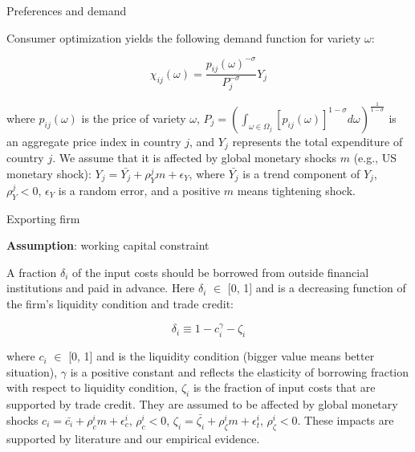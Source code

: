 \documentclass[10pt]{beamer}
\begin{document}
\begin{frame}{Preferences and demand}

Consumer optimization yields the following demand function for variety $\omega$:

\begin{equation}
\chi_{ij}(\omega)=\frac{p_{ij}(\omega)^{-\sigma}}{P_j^{-\sigma}} Y_j
\end{equation}


where $p_{ij}(\omega)$ is the price of variety $\omega$, $P_j=(\int_{\omega \in \Omega_j} [p_{ij}(\omega)]^{1-\sigma} d \omega)^{\frac{1}{1-\sigma}}$ is an aggregate price index in country $j$, and $Y_j$ represents the total expenditure of country $j$. We assume that it is affected by global monetary shocks $m$ (e.g., US monetary shock): $Y_j=\bar{Y_j}+\rho_{Y}^j m+\epsilon_Y$, where $\bar{Y_j}$ is a trend component of $Y_j$, $\rho_{Y}^j<0$, $\epsilon_Y$ is a random error, and a positive $m$ means tightening shock.

\end{frame}



\begin{frame}{Exporting firm}

\textbf{Assumption}: working capital constraint
\vfill

A fraction $\delta_i$ of the input costs should be borrowed from outside financial institutions and paid in advance. Here $\delta_i$ $\in$ [0, 1] and is a decreasing function of the firm's liquidity condition and trade credit: 

$$
\delta_i \equiv 1-c_i^\gamma-\zeta_i
$$

where $c_i$ $\in$ [0, 1] and is the liquidity condition (bigger value means better situation), $\gamma$ is a positive constant and reflects the elasticity of borrowing fraction with respect to liquidity condition, $\zeta_i$ is the fraction of input costs that are supported by trade credit. They are assumed to be affected by global monetary shocks $c_i=\bar{c_i}+\rho_c^i m+\epsilon_c^i$, $\rho_c^i<0$, $\zeta_i=\bar{\zeta_i}+\rho_\zeta^i m+\epsilon_t^i$,  $\rho_\zeta^i<0$. These impacts are supported by literature and our empirical evidence.

\end{frame}
\end{document}
